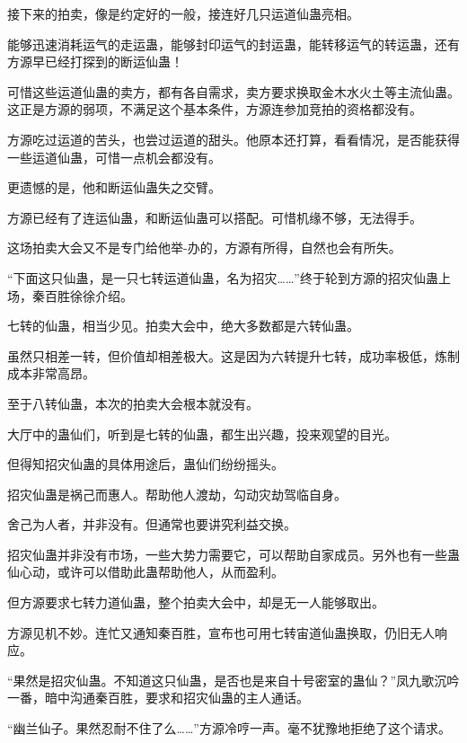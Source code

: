 
\begin{this_body}



接下来的拍卖，像是约定好的一般，接连好几只运道仙蛊亮相。

能够迅速消耗运气的走运蛊，能够封印运气的封运蛊，能转移运气的转运蛊，还有方源早已经打探到的断运仙蛊！

可惜这些运道仙蛊的卖方，都有各自需求，卖方要求换取金木水火土等主流仙蛊。这正是方源的弱项，不满足这个基本条件，方源连参加竞拍的资格都没有。

方源吃过运道的苦头，也尝过运道的甜头。他原本还打算，看看情况，是否能获得一些运道仙蛊，可惜一点机会都没有。

更遗憾的是，他和断运仙蛊失之交臂。

方源已经有了连运仙蛊，和断运仙蛊可以搭配。可惜机缘不够，无法得手。

这场拍卖大会又不是专门给他举-办的，方源有所得，自然也会有所失。

“下面这只仙蛊，是一只七转运道仙蛊，名为招灾……”终于轮到方源的招灾仙蛊上场，秦百胜徐徐介绍。

七转的仙蛊，相当少见。拍卖大会中，绝大多数都是六转仙蛊。

虽然只相差一转，但价值却相差极大。这是因为六转提升七转，成功率极低，炼制成本非常高昂。

至于八转仙蛊，本次的拍卖大会根本就没有。

大厅中的蛊仙们，听到是七转的仙蛊，都生出兴趣，投来观望的目光。

但得知招灾仙蛊的具体用途后，蛊仙们纷纷摇头。

招灾仙蛊是祸己而惠人。帮助他人渡劫，勾动灾劫驾临自身。

舍己为人者，并非没有。但通常也要讲究利益交换。

招灾仙蛊并非没有市场，一些大势力需要它，可以帮助自家成员。另外也有一些蛊仙心动，或许可以借助此蛊帮助他人，从而盈利。

但方源要求七转力道仙蛊，整个拍卖大会中，却是无一人能够取出。

方源见机不妙。连忙又通知秦百胜，宣布也可用七转宙道仙蛊换取，仍旧无人响应。

“果然是招灾仙蛊。不知道这只仙蛊，是否也是来自十号密室的蛊仙？”凤九歌沉吟一番，暗中沟通秦百胜，要求和招灾仙蛊的主人通话。

“幽兰仙子。果然忍耐不住了么……”方源冷哼一声。毫不犹豫地拒绝了这个请求。


\end{this_body}
